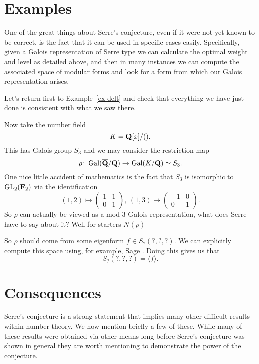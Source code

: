 \documentclass[a4paper,12pt]{article}
\begin{document}
\section{Examples}
One of the great things about Serre's conjecture, even if it were not yet known to be correct, is the fact that it can be used in specific cases easily.
Specifically, given a Galois representation of Serre type we can calculate the optimal weight and level as detailed above, and then in many instances we can compute the associated space of modular forms and look for a form from which our Galois representation arises.

\begin{ex}
Let's return first to Example~\ref{ex-delt} and check that everything we have just done is consistent with what we saw there.
\end{ex}

\begin{ex}
Now take the number field
\[
K = \mathbf{Q}[x]/().
\]
This has Galois group $S_3$ and we may consider the restriction map
\[
\rho\colon \operatorname{Gal}(\overline{\mathbf{Q}}/\mathbf{Q}) \to \operatorname{Gal}(K/\mathbf{Q}) \simeq S_3.
\]
One nice little accident of mathematics is the fact that $S_3$ is isomorphic to $\operatorname{GL}_2(\mathbf{F}_2)$ via the identification
\[
(1, 2) \mapsto \begin{pmatrix} 1 & 1 \\ 0 & 1 \end{pmatrix},\,
(1, 3) \mapsto \begin{pmatrix} -1 & 0 \\ 0 & 1 \end{pmatrix}.
\]
So $\rho$ can actually be viewed as a mod 3 Galois representation, what does Serre have to say about it?
Well for starters $N(\rho)$

So $\rho$ should come from some eigenform $f \in S_?(?,?,?)$.
We can explicitly compute this space using, for example, Sage \cite{Sage}.
Doing this gives us that
\[
S_?(?,?,?) = \langle f \rangle.
\]

\end{ex}


\section{Consequences}
Serre's conjecture is a strong statement that implies many other difficult results within number theory.
We now mention briefly a few of these.
While many of these results were obtained via other means long before Serre's conjecture was shown in general they are worth mentioning to demonstrate the power of the conjecture.
\end{document}
